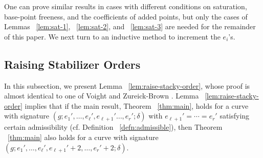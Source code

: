 \documentclass{amsart}
\theoremstyle{plain}
\theoremstyle{definition}
\theoremstyle{remark}
\newtheorem{rem}[thm]{Remark}
\numberwithin{equation}{section}
\newcommand\ssec{\subsection}
\begin{document}
One can prove similar results in cases with different conditions on saturation, base-point freeness, and the coefficients of added points, but only the cases of Lemmas ~\ref{lem:sat-1}, ~\ref{lem:sat-2}, and ~\ref{lem:sat-3} are needed for the remainder of this paper.  We next turn to an inductive method to increment the $e_i$'s.

\ssec{Raising Stabilizer Orders}
\label{ssec:raise-orders}
In this subsection, we present Lemma ~\ref{lem:raise-stacky-order},
whose proof is almost identical to one of Voight and Zureick-Brown
\cite[Theorem 8.5.7]{vzb:stacky}. Lemma
~\ref{lem:raise-stacky-order} implies that if the main result,
Theorem ~\ref{thm:main}, holds for a curve with signature $(g; e_1',
\ldots, e_\ell', e_{\ell + 1}' \ldots, e_r';\delta)$ with $e_{\ell + 1}' =
\cdots = e_r'$ satisfying certain admissibility (cf. Definition
~\ref{defn:admissible}), then Theorem ~\ref{thm:main} also holds for
a curve with signature $(g; e_1', \ldots, e_\ell', e_{\ell + 1}' + 2,
\ldots, e_r' + 2; \delta)$. 


\end{document}
